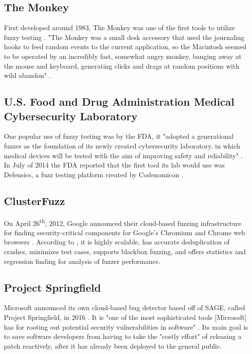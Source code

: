 \documentclass[10pt, final, journal, letterpaper, twoside, twocolumn]{IEEEtran}
\begin{document}
	\subsection{The Monkey}
		First developed around 1983, The Monkey was one of the first tools to utilize fuzzy testing \cite{textbook}. "The Monkey was a small desk accessory that used the journaling hooks to feed random events to the current application, so the Macintosh seemed to be operated by an incredibly fast, somewhat angry monkey, banging away at the mouse and keyboard, generating clicks and drags at random positions with wild abandon" \cite{monkey}.
	
	\subsection{U.S. Food and Drug Administration Medical Cybersecurity Laboratory}
		One popular use of fuzzy testing was by the FDA, it "adopted a generational fuzzer as the foundation of its newly created cybersecurity laboratory, in which medical devices will be tested with the aim of improving safety and reliability" \cite{fda}. In July of 2014 the FDA reported that the first tool its lab would use was Defensics, a fuzz testing platform created by Codenomicon \cite{codenomicon}.
		
	\subsection{ClusterFuzz}
		On April 26\textsuperscript{th}, 2012, Google announced their cloud-based fuzzing infrastructure for finding security-critical components for Google's Chromium and Chrome web browsers \cite{clusterfuzz}. According to \cite{clusterfuzz}, it is highly scalable, has accurate deduplication of crashes, minimizes test cases, supports blackbox fuzzing, and offers statistics and regression finding for analysis of fuzzer performance.
		
	\subsection{Project Springfield}
	Microsoft announced its own cloud-based bug detector based off of SAGE, called Project Springfield, in 2016 \cite{springfield}. It is "one of the most sophisticated tools [Microsoft] has for rooting out potential security vulnerabilities in software" \cite{springfield}. Its main goal is to save software developers from having to take the "costly effort" of releasing a patch reactively, after it has already been deployed to the general public. 
		
\end{document}
